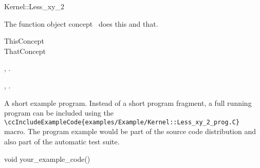 

\begin{ccRefFunctionObjectConcept}{Kernel::Less_xy_2}


\ccDefinition
  
The function object concept \ccRefName\ does this and that.

\ccGeneralizes

ThisConcept \\
ThatConcept

\ccTypes


\ccCreation
{}  %


\ccOperations


\ccHasModels

,
.

\ccSeeAlso

,
.

\ccExample

A short example program.
Instead of a short program fragment, a full running program can be
included using the 
\verb|\ccIncludeExampleCode{examples/Example/Kernel::Less_xy_2_prog.C}| 
macro. The program example would be part of the source code distribution and
also part of the automatic test suite.

\begin{ccExampleCode}
void your_example_code() {
}
\end{ccExampleCode}


\end{ccRefFunctionObjectConcept}


